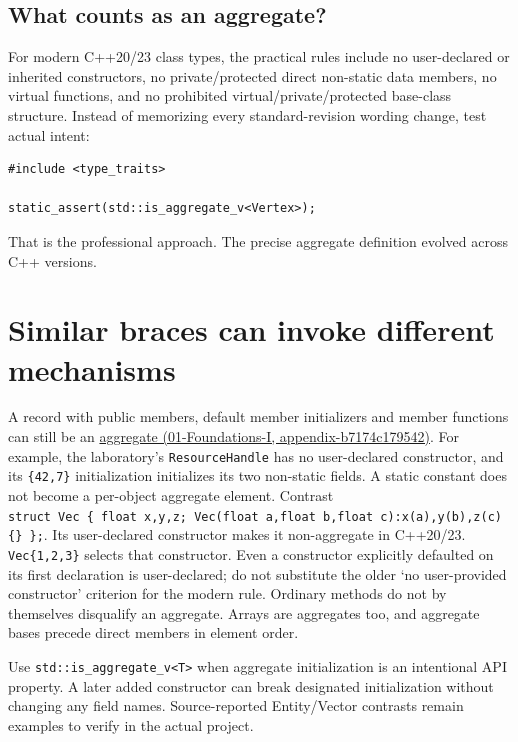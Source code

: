 \subsection{What counts as an aggregate?}\label{05-engine-i-ch003-what-counts-as-an-aggregate}

For modern C++20/23 class types, the practical rules include no user-declared or inherited constructors, no private/protected direct non-static data members, no virtual functions, and no prohibited virtual/private/protected base-class structure. Instead of memorizing every standard-revision wording change, test actual intent:

\begin{verbatim}
#include <type_traits>

static_assert(std::is_aggregate_v<Vertex>);
\end{verbatim}

That is the professional approach. The precise aggregate definition evolved across C++ versions.

\section{Similar braces can invoke different mechanisms}\label{05-engine-i-ch003-similar-braces-can-invoke-different-mechanisms}

A record with public members, default member initializers and member functions can still be an \href{../01-Foundations-I/main.pdf\#nameddest=appendix-b7174c179542}{aggregate (01-Foundations-I, appendix-b7174c179542)}. For example, the laboratory's \texttt{ResourceHandle} has no user-declared constructor, and its \texttt{\{42,7\}} initialization initializes its two non-static fields. A static constant does not become a per-object aggregate element. Contrast \texttt{struct\ Vec\ \{\ float\ x,y,z;\ Vec(float\ a,float\ b,float\ c):x(a),y(b),z(c)\{\}\ \};}. Its user-declared constructor makes it non-aggregate in C++20/23. \texttt{Vec\{1,2,3\}} selects that constructor. Even a constructor explicitly defaulted on its first declaration is user-declared; do not substitute the older `no user-provided constructor' criterion for the modern rule. Ordinary methods do not by themselves disqualify an aggregate. Arrays are aggregates too, and aggregate bases precede direct members in element order.

Use \texttt{std::is\_aggregate\_v\textless{}T\textgreater{}} when aggregate initialization is an intentional API property. A later added constructor can break designated initialization without changing any field names. Source-reported Entity/Vector contrasts remain examples to verify in the actual project.

